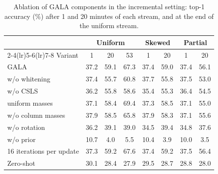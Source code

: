 \documentclass[10pt,twocolumn,letterpaper]{article}
\begin{document}
\begin{table}[h!]
\caption{Ablation of GALA components in the incremental setting: top-1 accuracy (\%) after 1 and 20 minutes of each stream, and at the end of the uniform stream.}
\label{tab:ablation}
\centering
\small
\setlength{\tabcolsep}{2.2pt}
\begin{tabular}{@{}lccccccc@{}}
\toprule
 & \multicolumn{3}{c}{Uniform} & \multicolumn{2}{c}{Skewed} & \multicolumn{2}{c}{Partial} \\
\cmidrule(lr){2-4}\cmidrule(lr){5-6}\cmidrule(lr){7-8}
Variant & 1 & 20 & 53 & 1 & 20 & 1 & 20 \\
\midrule
GALA & 37.2 & 59.1 & 67.3 & 37.4 & 59.0 & 37.4 & 56.1 \\
w/o whitening & 37.4 & 55.7 & 60.8 & 37.7 & 55.8 & 37.5 & 53.0 \\
w/o CSLS & 36.2 & 55.8 & 58.6 & 35.4 & 55.3 & 36.4 & 54.5 \\
uniform masses & 37.1 & 58.4 & 69.4 & 37.3 & 58.5 & 37.1 & 55.0 \\
w/o column masses & 37.9 & 58.5 & 65.8 & 37.9 & 58.3 & 37.1 & 55.6 \\
w/o rotation & 36.2 & 39.1 & 39.0 & 34.5 & 39.4 & 34.8 & 37.6 \\
w/o prior & 10.7 & 4.0 & 5.5 & 10.4 & 3.9 & 10.0 & 3.5 \\
16 iterations per update & 37.3 & 59.2 & 67.6 & 37.4 & 59.2 & 37.5 & 56.4 \\
\midrule
Zero-shot & 30.1 & 28.4 & 27.9 & 29.5 & 28.7 & 28.8 & 28.0 \\
\bottomrule
\end{tabular}
\end{table}
\end{document}
